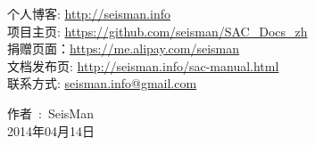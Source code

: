 \begin{flushleft}
个人博客: \url{http://seisman.info}                                     \\
项目主页: \url{https://github.com/seisman/SAC_Docs_zh}                  \\
捐赠页面：\url{https://me.alipay.com/seisman}                           \\
文档发布页: \url{http://seisman.info/sac-manual.html}                   \\
联系方式: \url{seisman.info@gmail.com}  

\end{flushleft}

\begin{flushright}
作者~:~SeisMan \\
2014年04月14日
\end{flushright}

